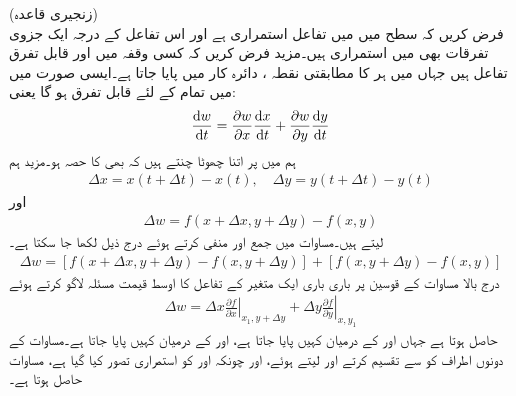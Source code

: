 \quad (زنجیری قاعدہ)\\
فرض کریں کہ  سطح میں   میں تفاعل  استمراری ہے  اور  اس تفاعل کے درجہ ایک جزوی تفرقات بھی  میں استمراری ہیں۔مزید فرض کریں کہ کسی وقفہ  میں  اور  قابل تفرق تفاعل ہیں جہاں  میں ہر  کا مطابقتی  نقطہ ، دائرہ کار  میں پایا جاتا ہے۔ایسی صورت میں  میں تمام  کے لئے   قابل تفرق ہو گا یعنی:
\begin{align}\label{مساوات_الاحصاء_زنجیری_تفرق_قاعدہ_الف}
\frac{\dif w}{\dif t}=\frac{\partial w}{\partial x}\frac{\dif x}{\dif t}+\frac{\partial w}{\partial y}\frac{\dif y}{\dif t}
\end{align}   
ہم  میں   پر  اتنا چھوٹا چنتے ہیں کہ  بھی  کا حصہ ہو۔مزید ہم 
\begin{align}\label{مساوات_الاحصاء_زنجیری_الف}
\Delta x=x(t+\Delta t)-x(t),\quad \Delta y=y(t+\Delta t)-y(t)
\end{align} 
اور
\begin{align}\label{مساوات_الاحصاء_زنجیری_ب}
\Delta w=f(x+\Delta x,y+\Delta y)-f(x,y)
\end{align}
لیتے ہیں۔مساوات  میں  جمع اور منفی کرتے ہوئے درج ذیل لکھا جا سکتا ہے۔
\begin{align*}
\Delta w=[f(x+\Delta x,y+\Delta y)-f(x,y+\Delta y)]+[f(x,y+\Delta y)-f(x,y)]
\end{align*}
درج بالا مساوات کے قوسین پر باری باری ایک متغیر کے تفاعل کا اوسط قیمت مسئلہ لاگو کرتے ہوئے
\begin{align}\label{مساوات_الاحصاء_زنجیری_پ}
\Delta w=\Delta x \left.\frac{\partial f}{\partial x} \right|_{x_1,y+\Delta y}+\Delta y \left.\frac{\partial f}{\partial y} \right|_{x,y_1}
\end{align}  
حاصل ہوتا ہے جہاں  اور  کے درمیان کہیں  پایا جاتا ہے،  اور  کے درمیان کہیں  پایا جاتا ہے۔مساوات  کے دونوں اطراف کو  سے تقسیم کرتے اور  لیتے ہوئے، اور چونکہ
  اور  کو استمراری تصور کیا گیا ہے، مساوات   حاصل ہوتا ہے۔

